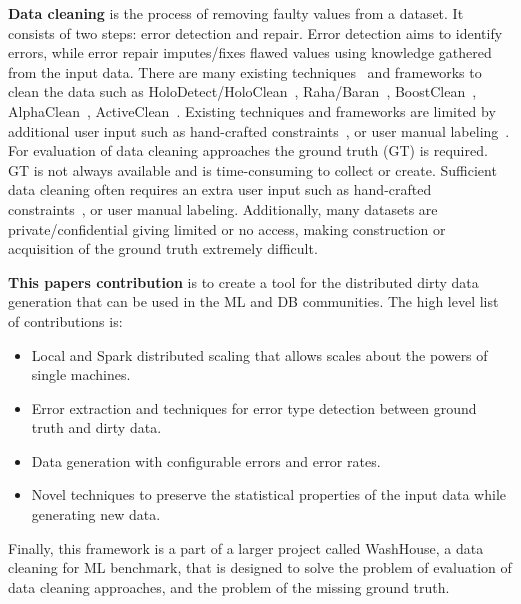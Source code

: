 \textbf{Data cleaning} is the process of removing faulty values from a dataset.
It consists of two steps: error detection and repair.
Error detection aims to identify errors, while error repair imputes/fixes flawed values using knowledge gathered from the input data. 
There are many existing techniques~\cite{duplicatesstudy, tdeexcel} and frameworks to clean the data such as HoloDetect/HoloClean~\cite{holodetect, RekatsinasCIR2017}, Raha/Baran~\cite{raha, baran}, BoostClean~\cite{boostclean}, AlphaClean~\cite{alphaclean}, ActiveClean~\cite{activeclean}. 
Existing techniques and frameworks are limited by additional user input such as hand-crafted constraints~\cite{bart}, or user manual labeling~\cite{raha, baran}.
For evaluation of data cleaning approaches the ground truth (GT) is required.
GT is not always available and is time-consuming to collect or create.
Sufficient data cleaning often requires an extra user input such as hand-crafted constraints~\cite{bart}, or user manual labeling.
Additionally, many datasets are private/confidential giving limited or no access, making construction or acquisition of the ground truth extremely difficult. 

\textbf{This papers contribution} is to create a tool for the distributed dirty data generation that can be used in the ML and DB communities. 
The high level list of contributions is:

\begin{itemize}
    \item Local and Spark distributed scaling that allows scales about the powers of single machines.
    \item Error extraction and techniques for error type detection between ground truth and dirty data.
    \item Data generation with configurable errors and error rates.
    \item Novel techniques to preserve the statistical properties of the input data while generating new data.
\end{itemize}

Finally, this framework is a part of a larger project called WashHouse, a data cleaning for ML benchmark, that is designed to solve the problem of evaluation of data cleaning approaches, and the problem of the missing ground truth.


